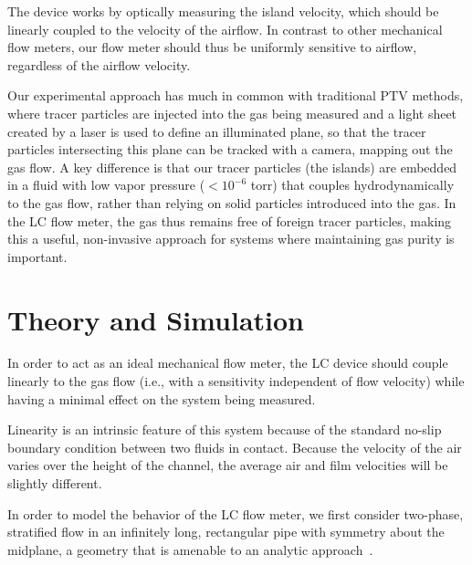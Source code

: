 \documentclass[aagreenthesis]{subfiles}
\begin{document}
The device works by
optically measuring the island velocity, which
should be linearly coupled to the velocity of the airflow.
In contrast to other mechanical flow meters, our
flow meter should thus be uniformly sensitive to airflow, regardless of the airflow velocity.


Our experimental approach has much in common with traditional PTV methods, where tracer
particles are injected into the gas being measured and a light sheet created
by a laser is used to define an illuminated plane, so that the tracer particles
intersecting this plane can be tracked with a camera, mapping out the gas
flow.
A key difference is that our tracer particles (the islands) are embedded in a
fluid with low
vapor pressure ($< 10^{-6}$ torr)\cite{Deschamps2008} that couples hydrodynamically to the gas flow,
rather than relying on solid particles introduced into the gas. In the LC flow meter, the
gas thus remains free of foreign tracer particles, making this a useful, non-invasive  approach for systems where maintaining
gas purity is important.


\section{Theory and Simulation}

In order to act as an ideal mechanical flow meter, the LC device should couple linearly to the gas flow (i.e., with a sensitivity
independent of flow velocity) while having a minimal effect on the system being measured.

Linearity is an intrinsic feature of this system because of the standard no-slip
boundary condition between two fluids in contact.
Because the velocity of the air varies over the height
of the channel, the average air and film velocities will be slightly different.

In order to model the behavior of the LC flow meter, we first consider
two-phase, stratified flow in an infinitely long, rectangular pipe with symmetry about the
midplane, a geometry that is amenable to an analytic
approach~\cite{GovierFlowComplexMixtures2008,HuhUseAirLiquidTwoPhase2002}.
\end{document}
